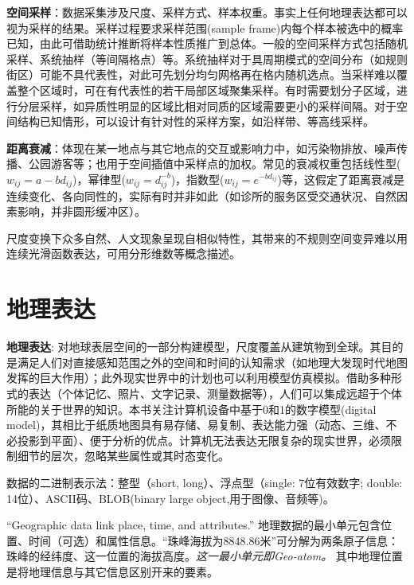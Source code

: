\par \textbf{空间采样}：数据采集涉及尺度、采样方式、样本权重。事实上任何地理表达都可以视为采样的结果。采样过程要求采样范围(sample frame)内每个样本被选中的概率已知，由此可借助统计推断将样本性质推广到总体。一般的空间采样方式包括随机采样、系统抽样（等间隔格点）等。系统抽样对于具周期模式的空间分布（如规则街区）可能不具代表性，对此可先划分均匀网格再在格内随机选点。当采样难以覆盖整个区域时，可在有代表性的若干局部区域聚集采样。有时需要划分子区域，进行分层采样，如异质性明显的区域比相对同质的区域需要更小的采样间隔。对于空间结构已知情形，可以设计有针对性的采样方案，如沿样带、等高线采样。

\par \textbf{距离衰减}：体现在某一地点与其它地点的交互或影响力中，如污染物排放、噪声传播、公园游客等；也用于空间插值中采样点的加权。常见的衰减权重包括线性型($w_{ij}=a-bd_{ij}$)，幂律型($w_{ij}=d_{ij}^{-b}$)，指数型($w_{ij}=e^{-bd_{ij}}$)等，这假定了距离衰减是连续变化、各向同性的，实际有时并非如此（如诊所的服务区受交通状况、自然因素影响，并非圆形缓冲区）。

\par 尺度变换下众多自然、人文现象呈现自相似特性，其带来的不规则空间变异难以用连续光滑函数表达，可用分形维数等概念描述。

\section{地理表达}

\par \textbf{地理表达}: 对地球表层空间的一部分构建模型，尺度覆盖从建筑物到全球。其目的是满足人们对直接感知范围之外的空间和时间的认知需求（如地理大发现时代地图发挥的巨大作用）；此外现实世界中的计划也可以利用模型仿真模拟。借助多种形式的表达（个体记忆、照片、文字记录、测量数据等），人们可以集成远超于个体所能的关于世界的知识。本书关注计算机设备中基于0和1的数字模型(digital model)，其相比于纸质地图具有易存储、易复制、表达能力强（动态、三维、不必投影到平面）、便于分析的优点。计算机无法表达无限复杂的现实世界，必须限制细节的层次，忽略某些属性或其时态变化。

\par 数据的二进制表示法：整型（short, long）、浮点型（single: 7位有效数字; double: 14位）、ASCII码、BLOB(binary large object,用于图像、音频等)。

\par ``Geographic data link place, time, and attributes.'' 地理数据的最小单元包含位置、时间（可选）和属性信息。``珠峰海拔为8848.86米''可分解为两条原子信息：珠峰的经纬度、这一位置的海拔高度。\emph{这一最小单元即Geo-atom。} 其中地理位置是将地理信息与其它信息区别开来的要素。

